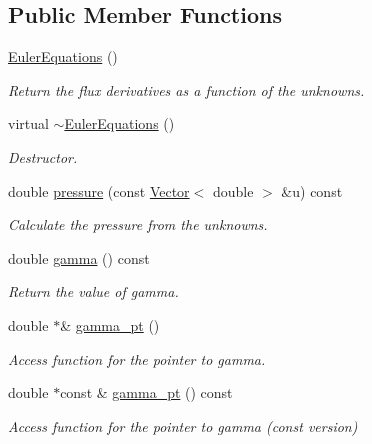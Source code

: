 \subsection*{Public Member Functions}
\begin{DoxyCompactItemize}
\item 
\hyperlink{classoomph_1_1EulerEquations_af24bad78c998c9d476c6bf0753af4ced}{Euler\+Equations} ()
\begin{DoxyCompactList}\small\item\em Return the flux derivatives as a function of the unknowns. \end{DoxyCompactList}\item 
virtual \hyperlink{classoomph_1_1EulerEquations_a0c60500b3b841a4065b588b55e6dfc49}{$\sim$\+Euler\+Equations} ()
\begin{DoxyCompactList}\small\item\em Destructor. \end{DoxyCompactList}\item 
double \hyperlink{classoomph_1_1EulerEquations_a227a4ad24989e3d1e50e41815436791f}{pressure} (const \hyperlink{classoomph_1_1Vector}{Vector}$<$ double $>$ \&u) const
\begin{DoxyCompactList}\small\item\em Calculate the pressure from the unknowns. \end{DoxyCompactList}\item 
double \hyperlink{classoomph_1_1EulerEquations_a51f474519ebab18d4b8504fa4b414d16}{gamma} () const
\begin{DoxyCompactList}\small\item\em Return the value of gamma. \end{DoxyCompactList}\item 
double $\ast$\& \hyperlink{classoomph_1_1EulerEquations_a51c9ada4af6c82571e76493ff3c377b9}{gamma\+\_\+pt} ()
\begin{DoxyCompactList}\small\item\em Access function for the pointer to gamma. \end{DoxyCompactList}\item 
double $\ast$const  \& \hyperlink{classoomph_1_1EulerEquations_aec33261b153f07968bdc4277ca1aa5ad}{gamma\+\_\+pt} () const
\begin{DoxyCompactList}\small\item\em Access function for the pointer to gamma (const version) \end{DoxyCompactList}\item 

\end{DoxyCompactItemize}
